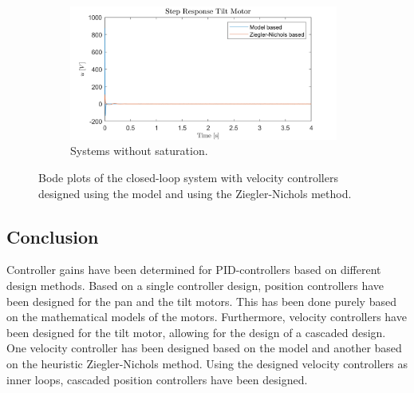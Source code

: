 \documentclass[../../main.tex]{subfiles}
\begin{document}
\begin{figure}[h]
\begin{subfigure}{0.48\textwidth}
    \includegraphics[width = 0.97\textwidth]{Sections/System_Design/Images/cascade_step_u_NoSat.png}
    \caption{Systems without saturation.}
    \label{fig:cascade_step_NZ}
\end{subfigure}
\caption{Bode plots of the closed-loop system with velocity controllers designed using the model and using the Ziegler-Nichols method.}
\label{fig:cascade_step}
\end{figure}




\subsection{Conclusion}
Controller gains have been determined for PID-controllers based on different design methods. Based on a single controller design, position controllers have been designed for the pan and the tilt motors. This has been done purely based on the mathematical models of the motors. Furthermore, velocity controllers have been designed for the tilt motor, allowing for the design of a cascaded design. One velocity controller has been designed based on the model and another based on the heuristic Ziegler-Nichols method. Using the designed velocity controllers as inner loops, cascaded position controllers have been designed.
\end{document}

